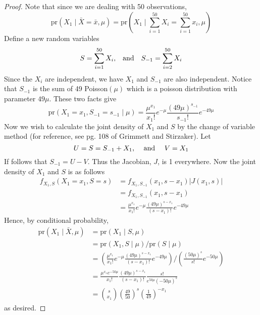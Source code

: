 \documentclass[letterpaper, 12pt]{article}\usepackage{graphicx, color}
\newcommand{\pr}{\text{pr}}
\newcommand{\sbs}{\;|\;} %
\begin{document}
\begin{enumerate}
\begin{enumerate}[(i)]
\begin{proof}
Note that since we are dealing with 50 observations, 
\begin{equation}
\pr(X_1 \sbs \bar{X} = \bar{x}, \mu) = \pr (X_1 \sbs \sum_{i=1}^{50} X_i = \sum_{i=1}^{50} x_i, \mu)
\end{equation}
Define a new random variables
\begin{equation}
S = \sum_{i=1}^{50} X_i \text
{,\quad and\quad } 
S_{-1} = \sum_{i=2}^{50} X_i
\end{equation}
Since the $X_i$ are independent, we have $X_1$ and $S_{-1}$ are also independent. Notice that $S_{-1}$ is the sum of 49 Poisson$(\mu)$ which is a poisson distribution with parameter $49 \mu$. These two facts give
\begin{equation}
\pr(X_1 = x_1, S_{-1} = s_{-1} \sbs \mu) = 
\frac{\mu^{x_1}}{x_1!} e^{-\mu} \frac{(49\mu)^{s_{-1}}}{s_{-1}!} e^{-49\mu}
\end{equation}
Now we wish to calculate the joint density of $X_1$ and $S$ by the change of variable method (for reference, see pg. 108 of Grimmett and Stirzaker). Let 
\begin{equation}
U = S = S_{-1} + X_1 
\text{, \quad and \quad } 
V = X_1
\end{equation}
If follows that $S_{-1} = U - V$. Thus the Jacobian, $J$, is 1 everywhere. Now the joint density of $X_1$ and $S$ is as follows
\begin{align}
f_{X_1, S} (X_1 = x_1, S = s) 
&= f_{X_1, S_{-1}} (x_1, s - x_1) | J (x_1, s)| \\
&= f_{X_1, S_{-1}} (x_1, s - x_1) \\
&= \frac{\mu^{x_1}}{x_1!} e^{-\mu} \frac{(49\mu)^{s - x_1}}{(s-x_1)!} e^{-49\mu}
\end{align}
Hence, by conditional probability,
\begin{align}
\pr(X_1 \sbs \bar{X}, \mu) &= \pr (X_1 \sbs S, \mu) \\ 
&= \pr(X_1, S \sbs \mu) / \pr(S \sbs \mu) \\
&= 
\left(\frac{\mu^{x_1}}{x_1!} e^{-\mu} \frac{(49\mu)^{s - x_1}}{(s-x_1)!} e^{-49\mu} \right)
/
\left( \frac{(50\mu)^{s}}{s!} e^{-50\mu} \right) \\
&= 
\frac{\mu^{x_1} e^{-50\mu}}{x_1!} \frac{(49\mu)^{s - x_1}}{(s-x_1)!}  
\frac{s!}{e^{50\mu}(-50\mu)^{s}}  \\
&=
\binom{s}{x_1} 
\left(\frac{49}{50}\right)^s 
\left( \frac{1}{49} \right)^{-x_1}
\end{align}
as desired.
\end{proof}


\end{enumerate}
\end{enumerate}
\end{document}
